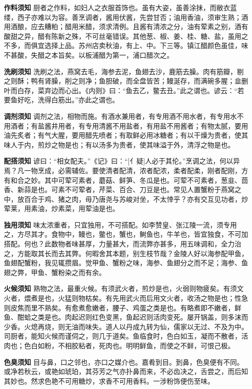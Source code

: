 \documentclass[]{article}
\begin{document}
\textbf{作料须知}
厨者之作料，如妇人之衣服首饰也。虽有大姿，虽善涂抹，而敝衣蓝缕，西子亦难以为容。善烹调者，酱用伏酱，先尝甘否；油用香油，须审生熟；酒用酒酿，应去糟粕；醋用米醋，须求清例。且酱有清浓之分，油有荤素之别，酒有酸甜之异，醋有陈新之殊，不可丝毫错误。其他葱、椒、姜、桂、糖、盐，虽用之不多，而俱宜选择上品。苏州店卖秋油，有上、中。下三等。镇江醋颜色虽佳，味不甚酸，失醋之本旨矣。以板浦醋为第一，浦口醋次之。

\textbf{洗刷须知}
洗刷之法，燕窝去毛，海参去泥，鱼翅去沙，鹿筋去臊。肉有筋瓣，剔之则酥；鸭有肾臊，削之则净；鱼胆破，而全盘皆苦；鳗涎存，而满碗多腥；韭删叶而白存，菜弃边而心出。《内则》曰：``鱼去乙，鳖去丑。''此之谓也。谚云：``若要鱼好吃，洗得白筋出。''亦此之谓也。

\textbf{调剂须知}
调剂之法，相物而施。有酒水兼用者，有专用酒不用水者，有专用水不用酒者；有盐酱井用者，有专用清酱不用盐者，有用盐不用酱者；有物太腻，要用油先炙者；有气大腥，要用醋先喷者；有取鲜必用冰糖者；有以干燥为贵者，使其味人于内，煎炒之物是也；有以汤多为贵者，使其味溢于外，清浮之物是也。

\textbf{配搭须知}
谚曰：``相女配夫。''《记》曰：``{[}亻疑{]}人必于其伦。''烹调之法，何以异焉？凡一物烹成，必需辅佐。要使清者配清，浓者配浓，柔者配柔，刚者配刚，方有和合之妙。其中可荤可素者，蘑菇、鲜笋、冬瓜是也。可荤不可素者，葱韭、茴香、新蒜是也。可素不可荤者，芹菜、百合、刀豆是也。常见人置蟹粉于燕窝之中，放百合于鸡、猪之肉，毋乃唐尧与苏峻对坐，不太悻乎？亦有交互见功者，炒荤莱，用素油，炒素菜，用荤油是也。

\textbf{独用须知}
味太浓重者，只宜独用，不可搭配。如李赞皇、张江陵一流，须专用之，方尽其才。食物中，鳗也，鳖也，蟹也，鲥鱼也，牛羊也，皆宜独食，不可加搭配。何也？此数物者味甚厚，力量甚大，而流弊亦甚多，用五味调和，全力治之，方能取其长而去其弊。何暇舍其本题，别生枝节哉？金陵人好以海参配甲鱼，鱼翅配蟹粉，我见辄攒眉。觉甲鱼、蟹粉之味，海参、鱼翅分之而不足；海参、鱼翅之弊，甲鱼、蟹粉染之而有余。

\textbf{火候须知}
熟物之法，最重火候。有须武火者，煎炒是也，火弱则物疲矣。有须文火者，煨煮是也，火猛则物枯矣。有先用武火而后用文火者，收汤之物是也；性急则皮焦而里不熟矣。有愈煮愈嫩者，腰子、鸡蛋之类是也。有略煮即不嫩者，鲜鱼、酣蛤之类是也。肉起迟则红色变黑，鱼起迟则活肉变死。屡开锅盖，则多沫而少香。火熄再烧，则无油而味失。道人以丹成九转为仙，儒家以无过、不及为中。司厨者，能知火候而谨伺之，则几于道矣。鱼临食时，色白如玉，凝而不散者，活肉也；色白如粉，不相胶粘者，死肉也。明明鲜鱼，而使之不鲜，可恨己极。

\textbf{色臭须知}
目与鼻，口之邻也，亦口之媒介也。嘉肴到目。到鼻，色臭便有不同。或净若秋云，或艳如琥珀，其芬芳之气亦扑鼻而来，不必齿决之，舌尝之，而后知其妙也。然求色艳不可用糖炒，求香不可用香料。一涉粉饰便伤至味。
\end{document}
